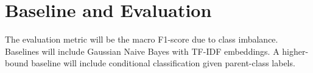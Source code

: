 \documentclass[11pt]{article}
\begin{document}
\section{Baseline and Evaluation}
The evaluation metric will be the macro F1-score due to class imbalance. Baselines will include Gaussian Naive Bayes with TF-IDF embeddings. A higher-bound baseline will include conditional classification given parent-class labels.



\end{document}
